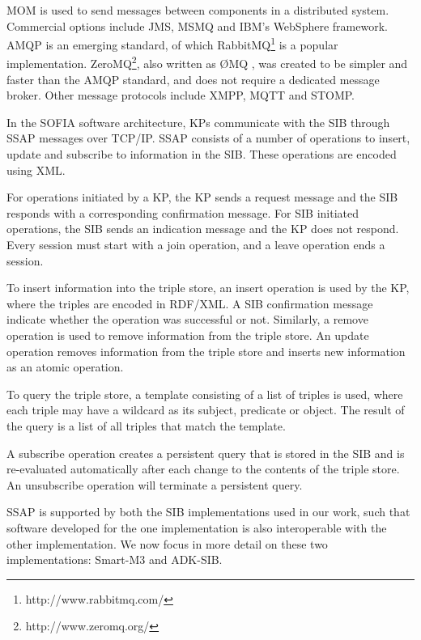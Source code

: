 \ac{MOM} is used to send messages between components in a distributed system. Commercial options include \ac{JMS}, \ac{MSMQ} and IBM's WebSphere framework.  \ac{AMQP} is an emerging standard, of which RabbitMQ\footnote{http://www.rabbitmq.com/} is a popular implementation. ZeroMQ\footnote{http://www.zeromq.org/}, also written as \O MQ , was created to be simpler and faster than the \ac{AMQP} standard, and does not require a dedicated message broker. Other message protocols include \ac{XMPP}, \ac{MQTT} and \ac{STOMP}.

In the \ac{SOFIA} software architecture, \acp{KP} communicate with the \ac{SIB} through \ac{SSAP} messages \cite{Honkola2010} over TCP/IP. \ac{SSAP} consists of a number of operations to insert, update and subscribe to information in the \ac{SIB}. These operations are encoded using \ac{XML}.

For operations initiated by a \ac{KP}, the \ac{KP} sends a request message and the \ac{SIB} responds with a corresponding confirmation message. For \ac{SIB} initiated operations, the \ac{SIB} sends an indication message and the \ac{KP} does not respond. Every session must start with a join operation, and a leave operation ends a session.

To insert information into the triple store, an insert operation is used by the \ac{KP}, where the triples are encoded in RDF/XML.  A \ac{SIB} confirmation message indicate whether the operation was successful or not. Similarly, a remove operation is used to remove information from the triple store. An update operation removes information from the triple store and inserts new information as an atomic operation.

To query the triple store, a template consisting of a list of triples is used, where each triple may have a wildcard as its subject, predicate or object. The result of the query is a list of all triples that match the template.

A subscribe operation creates a persistent query that is stored in the \ac{SIB} and is re-evaluated automatically after each change to the contents of the triple store. An unsubscribe operation will terminate a persistent query.

\ac{SSAP} is supported by both the \ac{SIB} implementations used in our work, such that software developed for the one implementation is also interoperable with the other implementation. We now focus in more detail on these two implementations: Smart-M3 and ADK-SIB.


